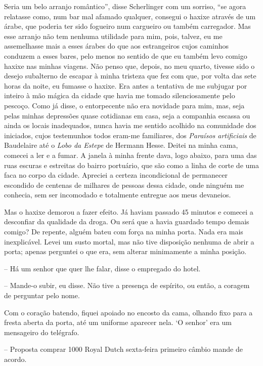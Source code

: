 Seria um belo arranjo romântico'', disse Scherlinger com um sorriso,
``se agora relatasse como, num bar mal afamado qualquer, consegui o
haxixe através de um árabe, que poderia ter sido fogueiro num cargueiro
ou também carregador. Mas esse arranjo não tem nenhuma utilidade para
mim, pois, talvez, eu me assemelhasse mais a esses árabes do que aos
estrangeiros cujos caminhos conduzem a esses bares, pelo menos no
sentido de que eu também levo comigo haxixe nas minhas viagens. Não
penso que, depois, no meu quarto, tivesse sido o desejo subalterno de
escapar à minha tristeza que fez com que, por volta das sete horas da
noite, eu fumasse o haxixe. Era antes a tentativa de me subjugar por
inteiro à mão mágica da cidade que havia me tomado silenciosamente pelo
pescoço. Como já disse, o entorpecente não era novidade para mim, mas,
seja pelas minhas depressões quase cotidianas em casa, seja a companhia
escassa ou ainda os locais inadequados, nunca havia me sentido acolhido
na comunidade dos iniciados, cujos testemunhos todos eram-me familiares,
dos \emph{Paraísos artificiais} de Baudelaire até o \emph{Lobo da
Estepe} de Hermann Hesse. Deitei na minha cama, comecei a ler e a fumar.
A janela à minha frente dava, logo abaixo, para uma das ruas escuras e
estreitas do bairro portuário, que são como a linha de corte de uma faca
no corpo da cidade. Apreciei a certeza incondicional de permanecer
escondido de centenas de milhares de pessoas dessa cidade, onde ninguém
me conhecia, sem ser incomodado e totalmente entregue aos meus
devaneios.

Mas o haxixe demorou a fazer efeito. Já haviam passado 45 minutos e
comecei a desconfiar da qualidade da droga. Ou será que a havia guardado
tempo demais comigo? De repente, alguém bateu com força na minha porta.
Nada era mais inexplicável. Levei um susto mortal, mas não tive
disposição nenhuma de abrir a porta; apenas perguntei o que era, sem
alterar minimamente a minha posição.

-- Há um senhor que quer lhe falar, disse o empregado do hotel.

-- Mande-o subir, eu disse. Não tive a presença de espírito, ou então, a
coragem de perguntar pelo nome.

Com o coração batendo, fiquei apoiado no encosto da cama, olhando fixo
para a fresta aberta da porta, até um uniforme aparecer nela. `O senhor'
era um mensageiro do telégrafo.

-- Proposta comprar 1000 Royal Dutch sexta-feira primeiro câmbio mande
de acordo.

